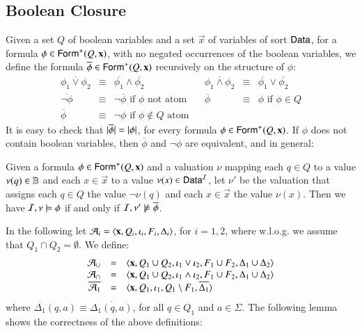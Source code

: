 \documentclass[10pt,conference,letterpaper,twocolumn]{IEEEtran}
\begin{document}
\subsection{Boolean Closure}

Given a set $Q$ of boolean variables and a set $\vec{x}$ of variables
of sort $\mathsf{Data}$, for a formula $\phi \in \mathsf{Form}^+(Q,\mathbf x)$, with no
negated occurrences of the boolean variables, we define the formula
$\overline{\phi} \in \mathsf{Form}^+(Q,\mathbf x)$ recursively on the structure
of $\phi$:
\[\begin{array}{lclclcl}
\overline{\phi_1 \vee \phi_2} & \equiv & \overline{\phi_1} \wedge \overline{\phi_2} && 
\overline{\phi_1 \wedge \phi_2} & \equiv & \overline{\phi_1} \vee \overline{\phi_2} \\ 
\overline{\neg\phi} & \equiv & \neg \overline{\phi} \text{ if $\phi$ not atom} &&
\overline{\phi} & \equiv & \phi \text{ if $\phi \in Q$} \\
\overline{\phi} & \equiv & \neg\phi \text{ if $\phi \not\in Q$ atom}
\end{array}\]
It is easy to check that ${|{\overline{\phi}}|} = {|{\phi}|}$, for
every formula $\phi \in \mathsf{Form}^+(Q,\mathbf x)$. If $\phi$ does not
contain boolean variables, then $\overline{\phi}$ and $\neg\phi$ are
equivalent, and in general:

\begin{proposition}\label{prop:overline}
  Given a formula $\phi \in \mathsf{Form}^+(Q,\mathbf x)$ and a valuation $\nu$
  mapping each $q \in Q$ to a value $\nu(q) \in \mathbb{B}$ and each $x \in
  \vec{x}$ to a value $\nu(x) \in \mathsf{Data}^{\mathcal{I}}$, let $\nu'$ be the
  valuation that assigns each $q \in Q$ the value $\neg\nu(q)$ and
  each $x \in \vec{x}$ the value $\nu(x)$. Then we have 
  $\mathcal{I},\nu \models \phi$ if and only if $\mathcal{I},\nu' \not\models \overline{\phi}$. 
\end{proposition}

In the following let $\mathcal{A}_i =
\left\langle \mathbf x,Q_i,\iota_i,F_i,\Delta_i \right\rangle$, for $i=1,2$, where
w.l.o.g. we assume that $Q_1 \cap Q_2 = \emptyset$. We define: 
\[\begin{array}{rcl}
\mathcal{A}_\cup & = & \left\langle \mathbf x,Q_1\cup Q_2,\iota_1 \vee \iota_2,F_1\cup F_2,\Delta_1\cup\Delta_2 \right\rangle \\ 
\mathcal{A}_\cap & = & \left\langle \mathbf x,Q_1\cup Q_2,\iota_1 \wedge \iota_2, F_1\cup F_2, \Delta_1\cup\Delta_2 \right\rangle \\ 
\overline{\mathcal{A}_1} & = & \langle \mathbf x,Q_1,\iota_1,Q_1\setminus F_1,\overline{\Delta_1} \rangle
\end{array}\] 
where $\overline{\Delta_1}(q,a) \equiv \overline{\Delta_1(q,a)}$, for
all $q \in Q_1$ and $a \in \Sigma$. The following lemma shows the
correctness of the above definitions:
\end{document}
